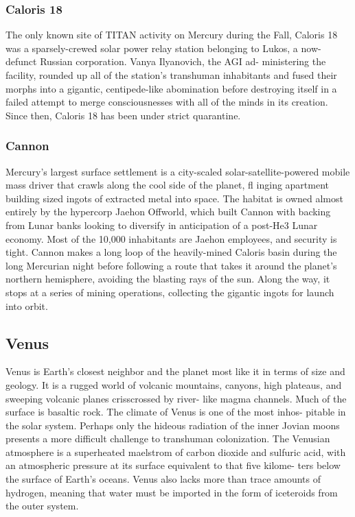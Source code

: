 \subsubsection{Caloris 18}

The only known site of TITAN activity on Mercury 
during the Fall, Caloris 18 was a sparsely-crewed solar 
power relay station belonging to Lukos, a now-defunct 
Russian corporation. Vanya Ilyanovich, the AGI ad-
ministering the facility, rounded up all of the station's 
transhuman inhabitants and fused their morphs into a 
gigantic, centipede-like abomination before destroying 
itself in a failed attempt to merge consciousnesses with 
all of the minds in its creation. Since then, Caloris 18 
has been under strict quarantine.

\subsubsection{Cannon}

Mercury's largest surface settlement is a city-scaled 
solar-satellite-powered mobile mass driver that crawls 
along the cool side of the planet, fl inging apartment 
building sized ingots of extracted metal into space. 
The habitat is owned almost entirely by the hypercorp 
Jaehon Offworld, which built Cannon with backing 
from Lunar banks looking to diversify in anticipation 
of a post-He3 Lunar economy. Most of the 10,000 
inhabitants are Jaehon employees, and security is 
tight. Cannon makes a long loop of the heavily-mined 
Caloris basin during the long Mercurian night before 
following a route that takes it around the planet's 
northern hemisphere, avoiding the blasting rays of 
the sun. Along the way, it stops at a series of mining 
operations, collecting the gigantic ingots for launch 
into orbit.

\subsection{Venus}

Venus is Earth's closest neighbor and the planet most 
like it in terms of size and geology. It is a rugged 
world of volcanic mountains, canyons, high plateaus, 
and sweeping volcanic planes crisscrossed by river-
like magma channels. Much of the surface is basaltic 
rock. The climate of Venus is one of the most inhos-
pitable in the solar system. Perhaps only the hideous 
radiation of the inner Jovian moons presents a more 
difficult challenge to transhuman colonization. The 
Venusian atmosphere is a superheated maelstrom of 
carbon dioxide and sulfuric acid, with an atmospheric 
pressure at its surface equivalent to that five kilome-
ters below the surface of Earth's oceans. Venus also 
lacks more than trace amounts of hydrogen, meaning 
that water must be imported in the form of iceteroids 
from the outer system.

